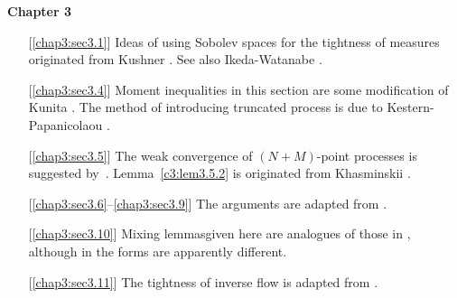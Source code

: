\noindent
\textbf{Chapter 3}
\begin{itemize}
\item[] [\ref{chap3:sec3.1}] Ideas of using Sobolev spaces for the tightness of
  measures originated from Kushner \cite{22}. See also Ikeda-Watanabe
  \cite{13}. 

\item[][\ref{chap3:sec3.4}] Moment inequalities in this section are some modification
  of Kunita \cite{20}. The method of introducing truncated process is due
  to Kestern-Papanicolaou \cite{15}. 

\item[][\ref{chap3:sec3.5}] The weak convergence of $(N + M)$-point processes is
  suggested by~\cite{15}. Lemma~\ref{c3:lem3.5.2} is originated from 
Khasminskii \cite{16}. 

\item[][\ref{chap3:sec3.6}--\ref{chap3:sec3.9}] The arguments are adapted from \cite{20}.

\item[][\ref{chap3:sec3.10}] Mixing lemmas\pageoriginale given here are analogues of those in \cite{15},
  although in \cite{15} the forms are apparently different. 

\item[][\ref{chap3:sec3.11}] The tightness of inverse flow is adapted from \cite{20}.
\end{itemize}


